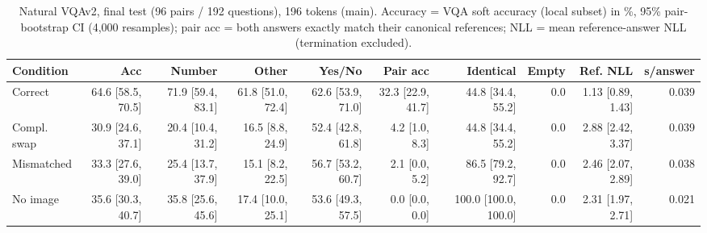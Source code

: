 \begin{table}[t]
\centering
\small
\caption{Natural VQAv2, final test (96 pairs / 192 questions), 196 tokens (main). Accuracy = VQA soft accuracy (local subset) in \%, 95\% pair-bootstrap CI (4,000 resamples); pair acc = both answers exactly match their canonical references; NLL = mean reference-answer NLL (termination excluded).}
\label{tab:t2_t2_final_vqa_main}
\begin{tabular}{lrrrrrrrrr}
\toprule
Condition & Acc & Number & Other & Yes/No & Pair acc & Identical & Empty & Ref. NLL & s/answer \\
\midrule
Correct & 64.6 [58.5, 70.5] & 71.9 [59.4, 83.1] & 61.8 [51.0, 72.4] & 62.6 [53.9, 71.0] & 32.3 [22.9, 41.7] & 44.8 [34.4, 55.2] & 0.0 & 1.13 [0.89, 1.43] & 0.039 \\
Compl. swap & 30.9 [24.6, 37.1] & 20.4 [10.4, 31.2] & 16.5 [8.8, 24.9] & 52.4 [42.8, 61.8] & 4.2 [1.0, 8.3] & 44.8 [34.4, 55.2] & 0.0 & 2.88 [2.42, 3.37] & 0.039 \\
Mismatched & 33.3 [27.6, 39.0] & 25.4 [13.7, 37.9] & 15.1 [8.2, 22.5] & 56.7 [53.2, 60.7] & 2.1 [0.0, 5.2] & 86.5 [79.2, 92.7] & 0.0 & 2.46 [2.07, 2.89] & 0.038 \\
No image & 35.6 [30.3, 40.7] & 35.8 [25.6, 45.6] & 17.4 [10.0, 25.1] & 53.6 [49.3, 57.5] & 0.0 [0.0, 0.0] & 100.0 [100.0, 100.0] & 0.0 & 2.31 [1.97, 2.71] & 0.021 \\
\bottomrule
\end{tabular}
\end{table}
